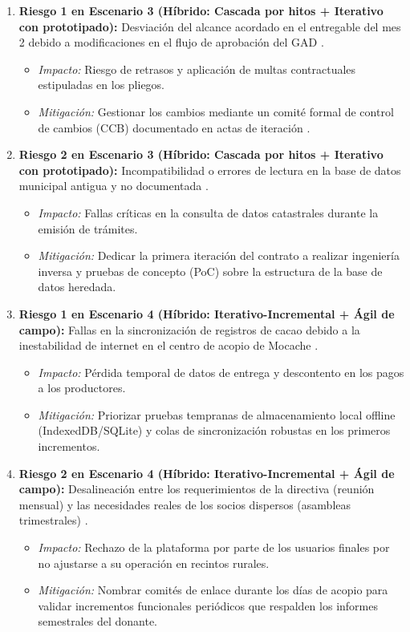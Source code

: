 \documentclass{article}
\begin{document}
\begin{enumerate}
    \item \textbf{Riesgo 1 en Escenario 3 (Híbrido: Cascada por hitos + Iterativo con prototipado):} Desviación del alcance acordado en el entregable del mes 2 debido a modificaciones en el flujo de aprobación del GAD \cite{GA_Prac_01}.
        \begin{itemize}
            \item \textit{Impacto:} Riesgo de retrasos y aplicación de multas contractuales estipuladas en los pliegos.
            \item \textit{Mitigación:} Gestionar los cambios mediante un comité formal de control de cambios (CCB) documentado en actas de iteración \cite{Pohl2025}.
        \end{itemize}
    \item \textbf{Riesgo 2 en Escenario 3 (Híbrido: Cascada por hitos + Iterativo con prototipado):} Incompatibilidad o errores de lectura en la base de datos municipal antigua y no documentada \cite{GA_Prac_01}.
        \begin{itemize}
            \item \textit{Impacto:} Fallas críticas en la consulta de datos catastrales durante la emisión de trámites.
            \item \textit{Mitigación:} Dedicar la primera iteración del contrato a realizar ingeniería inversa y pruebas de concepto (PoC) sobre la estructura de la base de datos heredada.
        \end{itemize}

    \item \textbf{Riesgo 1 en Escenario 4 (Híbrido: Iterativo-Incremental + Ágil de campo):} Fallas en la sincronización de registros de cacao debido a la inestabilidad de internet en el centro de acopio de Mocache \cite{GA_Prac_01}.
        \begin{itemize}
            \item \textit{Impacto:} Pérdida temporal de datos de entrega y descontento en los pagos a los productores.
            \item \textit{Mitigación:} Priorizar pruebas tempranas de almacenamiento local offline (IndexedDB/SQLite) y colas de sincronización robustas en los primeros incrementos.
        \end{itemize}
    \item \textbf{Riesgo 2 en Escenario 4 (Híbrido: Iterativo-Incremental + Ágil de campo):} Desalineación entre los requerimientos de la directiva (reunión mensual) y las necesidades reales de los socios dispersos (asambleas trimestrales) \cite{GA_Prac_01}.
        \begin{itemize}
            \item \textit{Impacto:} Rechazo de la plataforma por parte de los usuarios finales por no ajustarse a su operación en recintos rurales.
            \item \textit{Mitigación:} Nombrar comités de enlace durante los días de acopio para validar incrementos funcionales periódicos que respalden los informes semestrales del donante.
        \end{itemize}
\end{enumerate}
\end{document}
